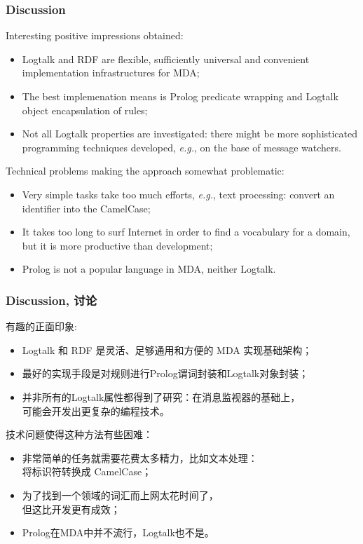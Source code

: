\documentclass[10pt]{beamer}
\begin{document}
\begin{frame}
  \frametitle{Discussion}
  Interesting positive impressions obtained:
  \begin{itemize}
  \item Logtalk and RDF are flexible, sufficiently universal and convenient implementation infrastructures for MDA;
  \item The best implemenation means is Prolog predicate wrapping and Logtalk object encapsulation of rules;
  \item Not all Logtalk properties are investigated: there might be more sophisticated programming techniques developed, \emph{e.g.}, on the base of message watchers.
  \end{itemize}
  Technical problems making the approach somewhat problematic:
  \begin{itemize}
  \item Very simple tasks take too much efforts, \emph{e.g.}, text processing: convert an identifier into the CamelCase;
  \item It takes too long to surf Internet in order to find a vocabulary for a domain, but it is more productive than development;
  \item Prolog is not a popular language in MDA, neither Logtalk.
  \end{itemize}
\end{frame}

\begin{frame}
  \frametitle{Discussion, 讨论}
  有趣的正面印象:
  \begin{itemize}
  \item Logtalk 和 RDF 是灵活、足够通用和方便的 MDA 实现基础架构；
  \item 最好的实现手段是对规则进行Prolog谓词封装和Logtalk对象封装；
  \item 并非所有的Logtalk属性都得到了研究：在消息监视器的基础上，\\ 可能会开发出更复杂的编程技术。
  \end{itemize}
  技术问题使得这种方法有些困难：
  \begin{itemize}
  \item 非常简单的任务就需要花费太多精力，比如文本处理：\\将标识符转换成 CamelCase；
  \item 为了找到一个领域的词汇而上网太花时间了，\\但这比开发更有成效；
  \item Prolog在MDA中并不流行，Logtalk也不是。
  \end{itemize}
\end{frame}
\end{document}
